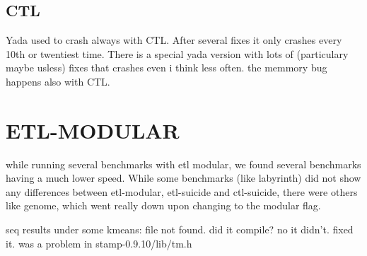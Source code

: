\documentclass[a4paper,10pt]{report}
\begin{document}
\subsection{CTL}
Yada used to crash always with CTL. After several fixes it only crashes every 10th or twentiest time.
There is a special yada version with lots of (particulary maybe usless) fixes that crashes even i think less often.
the memmory bug happens also with CTL.

\section{ETL-MODULAR}
while running several benchmarks with etl modular, we found several benchmarks having a much lower speed.
While some benchmarks (like labyrinth) did not show any differences between etl-modular, etl-suicide and ctl-suicide, there were others like genome, 
which went really down upon changing to the modular flag.

seq results under some kmeans: file not found. did it compile? no it didn't. fixed it. was a problem in stamp-0.9.10/lib/tm.h
\end{document}

